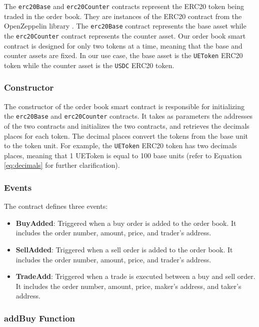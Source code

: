 The \texttt{erc20Base} and \texttt{erc20Counter} contracts represent the ERC20 token being traded in the order book. They are
instances of the ERC20 contract from the OpenZeppelin library \cite{openzeppelin_erc20}. The \texttt{erc20Base} contract represents
the base asset while the \texttt{erc20Counter} contract represents the counter asset. Our order book smart contract is designed
for only two tokens at a time, meaning that the base and counter assets are fixed. In our use case, the base asset is the \texttt{UEToken}
ERC20 token while the counter asset is the \texttt{USDC} ERC20 token.


\subsubsection{Constructor}


The constructor of the order book smart contract is responsible for initializing the \texttt{erc20Base} and \texttt{erc20Counter}
contracts. It takes as parameters the addresses of the two contracts and initializes the two contracts, and retrieves the decimals
places for each token. The decimal places convert the tokens from the base unit to the token unit. For example,
the \texttt{UEToken} ERC20 token has two decimals places, meaning that 1 UEToken is equal to 100 base units (refer to Equation \ref{eq:decimals}
for further clarification).

\subsubsection{Events}


The contract defines three events:


\begin{itemize}
   \item \textbf{BuyAdded}: Triggered when a buy order is added to the order book. It includes the order number, amount, price, and trader's address.
   \item \textbf{SellAdded}: Triggered when a sell order is added to the order book. It includes the order number, amount, price, and trader's address.
   \item \textbf{TradeAdd}: Triggered when a trade is executed between a buy and sell order. It includes the order number, amount, price, maker's address, and taker's address.
\end{itemize}


\subsubsection{addBuy Function}


